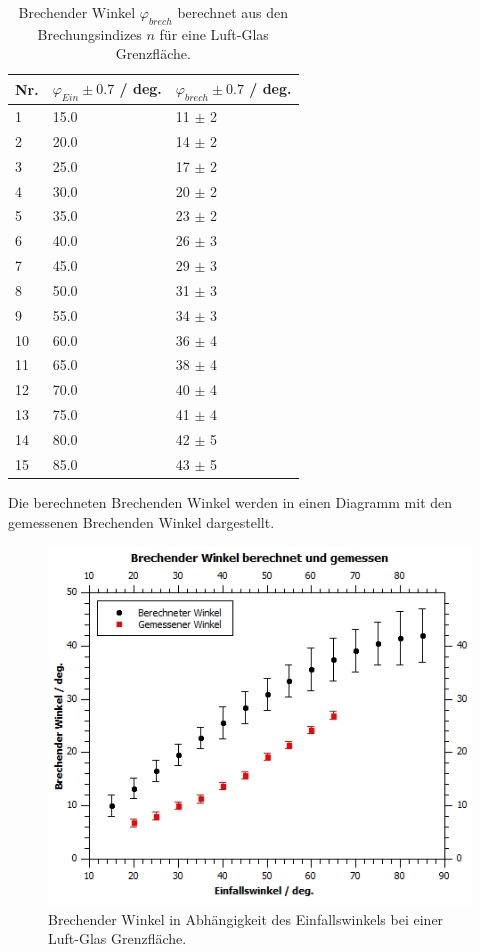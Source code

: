 \documentclass[12pt,a4paper,twoside]{article}
\begin{document}
\begin{table}[H]
    \centering
    \caption{Brechender Winkel $\varphi_{brech}$ berechnet aus den Brechungsindizes $n$ für eine Luft-Glas Grenzfläche. }
    \label{tab:brechender winkel berechnet}
    \begin{tabular}{| l | l | l |}
        \hline
        Nr. & $\varphi_{Ein} \pm 0.7$ / deg.  & $\varphi_{brech} \pm 0.7$ / deg.   \\
        \hline
        1  & 15.0  & 11 $\pm$  2 \\ %
        2  & 20.0  & 14 $\pm$  2 \\ %
        3  & 25.0  & 17 $\pm$  2 \\ %
        4  & 30.0  & 20 $\pm$  2 \\ %
        5  & 35.0  & 23 $\pm$  2 \\ %
        6  & 40.0  & 26 $\pm$  3 \\ %
        7  & 45.0  & 29 $\pm$  3 \\ %
        8  & 50.0  & 31 $\pm$  3 \\ %
        9  & 55.0  & 34 $\pm$  3 \\ %
        10 & 60.0  & 36 $\pm$  4 \\ %
        11 & 65.0  & 38 $\pm$  4 \\ %
        12 & 70.0  & 40 $\pm$  4 \\ %
        13 & 75.0  & 41 $\pm$  4 \\ %
        14 & 80.0  & 42 $\pm$  5 \\ %
        15 & 85.0  & 43 $\pm$  5 \\ %
        \hline
    \end{tabular}
\end{table}

\noindent
Die berechneten Brechenden Winkel werden in einen Diagramm mit den gemessenen Brechenden Winkel dargestellt. 

\begin{figure}[H]
    \centering
    \includegraphics[width=0.6\linewidth]{nudes/brechender winkel.jpg}
    \caption{Brechender Winkel in Abhängigkeit des Einfallswinkels bei einer Luft-Glas Grenzfläche. }
    \label{fig:brechender winkel}
\end{figure}
\end{document}

